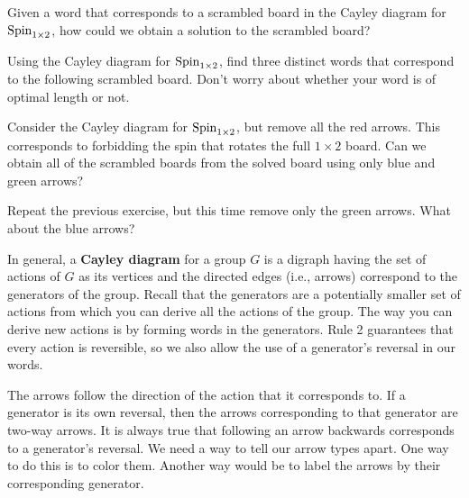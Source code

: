 \begin{exercise}
Given a word that corresponds to a scrambled board in the Cayley diagram for $\operatorname{Spin}_{1\times 2}$, how could we obtain a solution to the scrambled board?
\end{exercise}

\begin{exercise}
Using the Cayley diagram for $\operatorname{Spin}_{1\times 2}$, find three distinct words that correspond to the following scrambled board.  Don't worry about whether your word is of optimal length or not.

\begin{center}
\end{center}
\end{exercise}

\begin{exercise}
Consider the Cayley diagram for $\operatorname{Spin}_{1\times 2}$, but remove all the red arrows.  This corresponds to forbidding the spin that rotates the full $1\times 2$ board.  Can we obtain all of the scrambled boards from the solved board using only blue and green arrows?
\end{exercise}

\begin{exercise}\label{exer:minimal_Cayley_Spin1by2}
Repeat the previous exercise, but this time remove only the green arrows.  What about the blue arrows?
\end{exercise}

In general, a \textbf{Cayley diagram} for a group $G$ is a digraph having the set of actions of $G$ as its vertices and the directed edges (i.e., arrows) correspond to the generators of the group.  Recall that the generators are a potentially smaller set of actions from which you can derive all the actions of the group.  The way you can derive new actions is by forming words in the generators.  Rule 2 guarantees that every action is reversible, so we also allow the use of a generator's reversal in our words.  

The arrows follow the direction of the action that it corresponds to. If a generator is its own reversal, then the arrows corresponding to that generator are two-way arrows.  It is always true that following an arrow backwards corresponds to a generator's reversal.  We need a way to tell our arrow types apart.  One way to do this is to color them.  Another way would be to label the arrows by their corresponding generator.

